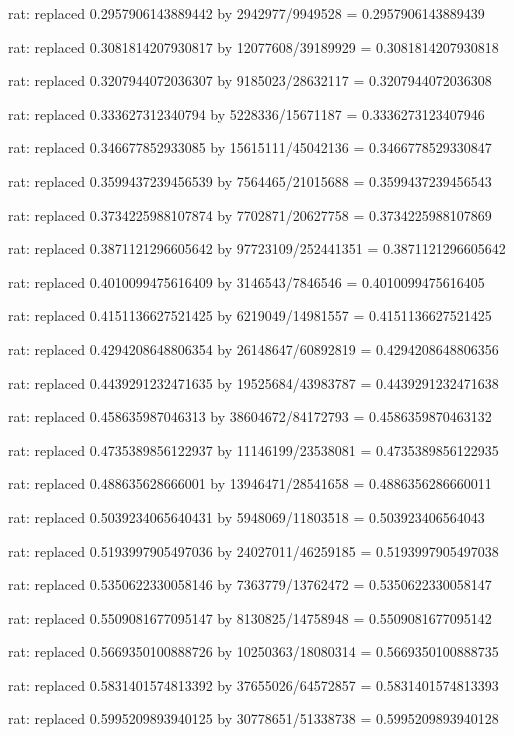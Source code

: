 \documentclass[a4paper,10pt]{article}
\begin{document}
\begin{eulernotebook}
\begin{eulercomment}
\begin{eulercomment}
\begin{eulercomment}
\begin{eulercomment}
\begin{eulercomment}
\begin{eulercomment}
\begin{eulercomment}
\begin{eulercomment}
\begin{eulercomment}
\begin{eulercomment}
\begin{eulercomment}
\begin{eulercomment}
\begin{eulercomment}
\begin{eulercomment}
\begin{eulercomment}
\begin{eulercomment}
\begin{euleroutput}
  rat: replaced 0.2957906143889442 by 2942977/9949528 = 0.2957906143889439
  
  rat: replaced 0.3081814207930817 by 12077608/39189929 = 0.3081814207930818
  
  rat: replaced 0.3207944072036307 by 9185023/28632117 = 0.3207944072036308
  
  rat: replaced 0.333627312340794 by 5228336/15671187 = 0.3336273123407946
  
  rat: replaced 0.346677852933085 by 15615111/45042136 = 0.3466778529330847
  
  rat: replaced 0.3599437239456539 by 7564465/21015688 = 0.3599437239456543
  
  rat: replaced 0.3734225988107874 by 7702871/20627758 = 0.3734225988107869
  
  rat: replaced 0.3871121296605642 by 97723109/252441351 = 0.3871121296605642
  
  rat: replaced 0.4010099475616409 by 3146543/7846546 = 0.4010099475616405
  
  rat: replaced 0.4151136627521425 by 6219049/14981557 = 0.4151136627521425
  
  rat: replaced 0.4294208648806354 by 26148647/60892819 = 0.4294208648806356
  
  rat: replaced 0.4439291232471635 by 19525684/43983787 = 0.4439291232471638
  
  rat: replaced 0.458635987046313 by 38604672/84172793 = 0.4586359870463132
  
  rat: replaced 0.4735389856122937 by 11146199/23538081 = 0.4735389856122935
  
  rat: replaced 0.488635628666001 by 13946471/28541658 = 0.4886356286660011
  
  rat: replaced 0.5039234065640431 by 5948069/11803518 = 0.503923406564043
  
  rat: replaced 0.5193997905497036 by 24027011/46259185 = 0.5193997905497038
  
  rat: replaced 0.5350622330058146 by 7363779/13762472 = 0.5350622330058147
  
  rat: replaced 0.5509081677095147 by 8130825/14758948 = 0.5509081677095142
  
  rat: replaced 0.5669350100888726 by 10250363/18080314 = 0.5669350100888735
  
  rat: replaced 0.5831401574813392 by 37655026/64572857 = 0.5831401574813393
  
  rat: replaced 0.5995209893940125 by 30778651/51338738 = 0.5995209893940128
  

\end{euleroutput}
\end{eulercomment}
\end{eulercomment}
\end{eulercomment}
\end{eulercomment}
\end{eulercomment}
\end{eulercomment}
\end{eulercomment}
\end{eulercomment}
\end{eulercomment}
\end{eulercomment}
\end{eulercomment}
\end{eulercomment}
\end{eulercomment}
\end{eulercomment}
\end{eulercomment}
\end{eulercomment}
\end{eulernotebook}
\end{document}
